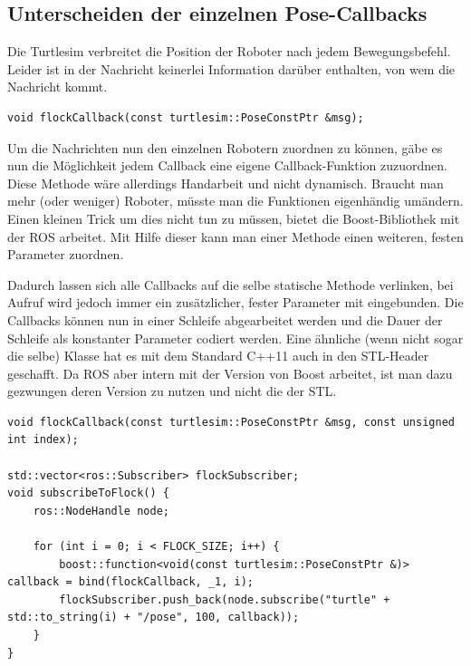 \subsection*{Unterscheiden der einzelnen Pose-Callbacks}

Die Turtlesim verbreitet die Position der Roboter nach jedem Bewegungsbefehl. Leider ist in der Nachricht  keinerlei Information darüber enthalten, von wem die Nachricht kommt.

\begin{lstlisting}[style=cpp, title=Callback-Funktion für Pose.msg]
void flockCallback(const turtlesim::PoseConstPtr &msg);
\end{lstlisting}

Um die Nachrichten nun den einzelnen Robotern zuordnen zu können, gäbe es nun die Möglichkeit jedem Callback eine eigene Callback-Funktion zuzuordnen. Diese Methode wäre allerdings Handarbeit und nicht dynamisch. Braucht man mehr (oder weniger) Roboter, müsste man die Funktionen eigenhändig umändern.
Einen kleinen Trick um dies nicht tun zu müssen, bietet die Boost-Bibliothek mit der \ac{ROS} arbeitet. Mit Hilfe dieser kann man einer Methode einen weiteren, festen Parameter zuordnen.

Dadurch lassen sich alle Callbacks auf die selbe statische Methode verlinken, bei Aufruf wird jedoch immer ein zusätzlicher, fester Parameter mit eingebunden. Die Callbacks können nun in einer Schleife abgearbeitet werden und die Dauer der Schleife als konstanter Parameter codiert werden.
Eine ähnliche (wenn nicht sogar die selbe) Klasse hat es mit dem Standard C++11 auch in den STL-Header  geschafft\cite{CPP_REFERENCE_FUNCTION}. Da \ac{ROS} aber intern mit der Version von Boost arbeitet\cite{BOOST_REFERENCE_FUNCTION}\cite{ROS_SOURCE_NodeHandle}, ist man dazu gezwungen deren Version zu nutzen und nicht die der STL.

\begin{lstlisting}[style=cpp, title=Callback-Funktion für Pose.msg mit Boost]
void flockCallback(const turtlesim::PoseConstPtr &msg, const unsigned int index);

std::vector<ros::Subscriber> flockSubscriber;
void subscribeToFlock() {
    ros::NodeHandle node;

    for (int i = 0; i < FLOCK_SIZE; i++) {
        boost::function<void(const turtlesim::PoseConstPtr &)> callback = bind(flockCallback, _1, i);
        flockSubscriber.push_back(node.subscribe("turtle" + std::to_string(i) + "/pose", 100, callback));
    }
}
\end{lstlisting}

